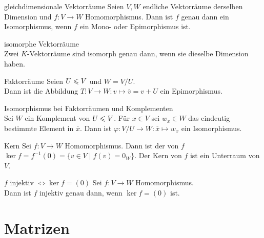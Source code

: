\begin{Satz}{gleichdimensionale Vektorräume}
    Seien $V, W$ endliche Vektorräume derselben Dimension
    und $f: V \rightarrow W$ Homomorphismus.
    Dann ist $f$ genau dann ein Isomorphismus, wenn $f$ ein Mono- oder
    Epimorphismus ist.
\end{Satz}

\begin{Satz}{isomorphe Vektorräume} \\
    Zwei $K$-Vektorräume sind isomorph genau dann, wenn sie dieselbe Dimension
    haben.
\end{Satz}

\begin{Satz}{Faktorräume}
    Seien $U \leqslant V$ und $W = V/U$. \\
    Dann ist die Abbildung $T: V \rightarrow W: v \mapsto \overline{v} = v + U$
    ein Epimorphismus.
\end{Satz}

\begin{Satz}{Isomorphismus bei Faktorräumen und Komplementen} \\
    Sei $W$ ein Komplement von $U \leqslant V$.
    Für $x \in V$ sei $w_x \in W$ das eindeutig bestimmte Element in
    $\overline{x}$.
    Dann ist $\varphi: V/U \rightarrow W: \overline{x} \mapsto w_x$ ein
    Isomorphismus.
\end{Satz}

\begin{Def}{Kern}
    Sei $f: V \rightarrow W$ Homomorphismus.
    Dann ist der  von $f$ \\
    $\ker f = f^{-1}(0) = \{v \in V \;|\; f(v) = 0_W\}$.
    Der Kern von $f$ ist ein Unterraum von $V$.
\end{Def}

\begin{Satz}{$f$ injektiv $\Leftrightarrow \ker f = (0)$}
    Sei $f: V \rightarrow W$ Homomorphismus. \\
    Dann ist $f$ injektiv genau dann, wenn $\ker f = (0)$ ist.
\end{Satz}

\section{%
    Matrizen%
}

